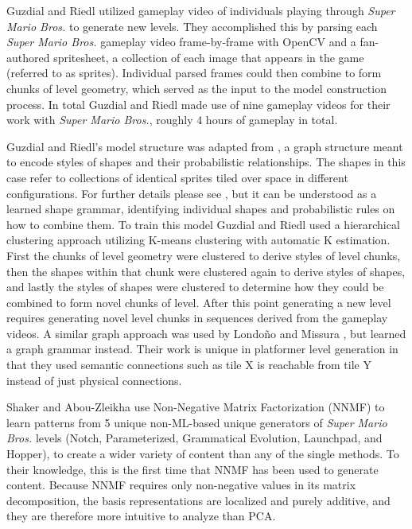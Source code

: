 \documentclass[a4paper]{article}
\begin{document}
 Guzdial and Riedl utilized gameplay video of individuals playing through \textit{Super Mario Bros.} to generate new levels. They accomplished this by parsing each \textit{Super Mario Bros.} gameplay video frame-by-frame with OpenCV \cite{Pulli:2012:RCV:2184319.2184337} and a fan-authored spritesheet, a collection of each image that appears in the game (referred to as sprites). Individual parsed frames could then combine to form chunks of level geometry, which served as the input to the model construction process. In total Guzdial and Riedl made use of nine gameplay videos for their work with \textit{Super Mario Bros.}, roughly 4 hours of gameplay in total.

Guzdial and Riedl's model structure was adapted from \cite{kalogerakis:2012:SIG}, a graph structure meant to encode styles of shapes and their probabilistic relationships. The shapes in this case refer to collections of identical sprites tiled over space in different configurations. For further details please see \cite{guzdial2016game}, but it can be understood as a learned shape grammar, identifying individual shapes and probabilistic rules on how to combine them. To train this model Guzdial and Riedl used a hierarchical clustering approach utilizing K-means clustering with automatic K estimation. First the chunks of level geometry were clustered to derive styles of level chunks, then the shapes within that chunk were clustered again to derive styles of shapes, and lastly the styles of shapes were clustered to determine how they could be combined to form novel chunks of level. After this point generating a new level requires generating novel level chunks in sequences derived from the gameplay videos.   A similar graph approach was used by Londo\~{n}o and Missura \cite{MARIOGRAPHGRAMMAR}, but learned a graph grammar instead.  Their work is unique in platformer level generation in that they used semantic connections such as tile X is reachable from tile Y instead of just physical connections.

 Shaker and Abou-Zleikha \cite{shaker2014alone} use Non-Negative Matrix Factorization (NNMF) to learn patterns from 5 unique non-ML-based unique generators of \textit{Super Mario Bros.} levels (Notch, Parameterized, Grammatical Evolution, Launchpad, and Hopper), to create a wider variety of content than any of the single methods.  To their knowledge, this is the first time that NNMF has been used to generate content.  Because NNMF requires only non-negative values in its matrix decomposition, the basis representations are localized and purely additive, and they are therefore more intuitive to analyze than PCA.
\end{document}
